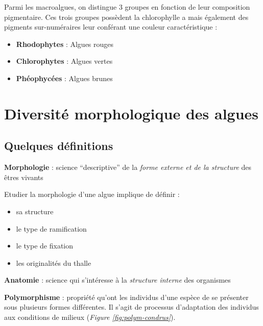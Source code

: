 \documentclass[
]{book}
\providecommand{\tightlist}{%
  \setlength{\itemsep}{0pt}\setlength{\parskip}{0pt}}
\begin{document}
Parmi les macroalgues, on distingue 3 groupes en fonction de leur composition pigmentaire. Ces trois groupes possèdent la chlorophylle a mais également des pigments sur-numéraires leur conférant une couleur caractéristique :

\begin{itemize}
\item
  \textbf{Rhodophytes} : Algues rouges
\item
  \textbf{Chlorophytes} : Algues vertes
\item
  \textbf{Phéophycées} : Algues brunes
\end{itemize}

\hypertarget{morphologie}{%
\chapter{Diversité morphologique des algues}\label{morphologie}}

\hypertarget{quelques-duxe9finitions}{%
\section*{Quelques définitions}\label{quelques-duxe9finitions}}

\textbf{Morphologie} : science ``descriptive'' de la \emph{forme externe et de la structure} des êtres vivants

Etudier la morphologie d'une algue implique de définir :

\begin{itemize}
\tightlist
\item
  sa structure
\item
  le type de ramification
\item
  le type de fixation
\item
  les originalités du thalle
\end{itemize}

\textbf{Anatomie} : science qui s'intéresse à la \emph{structure interne} des organismes

\textbf{Polymorphisme} : propriété qu'ont les individus d'une espèce de se présenter sous plusieurs formes différentes. Il s'agit de processus d'adaptation des individus aux conditions de milieux (\emph{Figure \ref{fig:polym-condrus}}).
\end{document}

